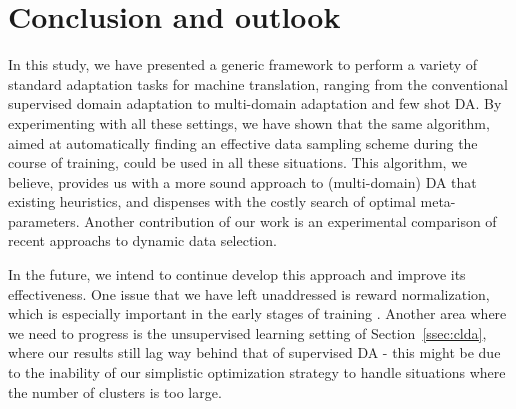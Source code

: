 \documentclass[11pt]{article}
\newcommand{\fyDone}[1]{\done[FY]\Todo[FY:]{\textcolor{orange}{#1}}}
\begin{document}
\section{Conclusion and outlook \label{sec:conclusion}}

\fyDone{Write conclusion}
In this study, we have presented a generic framework to perform a variety of standard adaptation tasks for machine translation, ranging from the conventional supervised domain adaptation to multi-domain adaptation and few shot DA. By experimenting with all these settings, we have shown that the same algorithm, aimed at automatically finding an effective data sampling scheme during  the course of training, could be used in all these situations. This algorithm, we believe, provides us with a more sound approach to (multi-domain) DA that existing heuristics, and dispenses with the costly search of optimal meta-parameters. Another contribution of our work is an experimental comparison of recent approachs to dynamic data selection.

In the future, we intend to continue develop this approach and improve its effectiveness. One issue that we have left unaddressed is reward normalization, which is especially important in the early stages of training \cite{Kumar19reinforcement}. Another area where we need to progress is the unsupervised learning setting of Section~\ref{ssec:clda}, where our results still lag way behind that of supervised DA - this might be due to the inability of our simplistic optimization strategy to handle situations where the number of clusters is too large.



\end{document}
